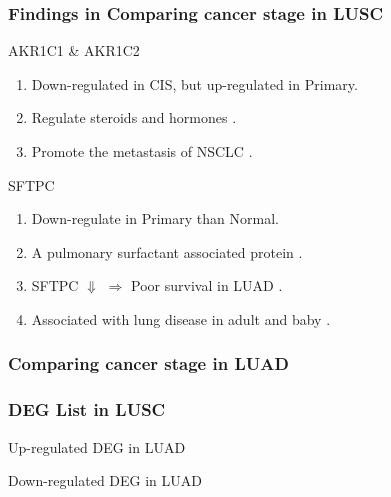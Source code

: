 \documentclass{beamer}
\begin{document}
    \begin{frame}
        \frametitle{Findings in Comparing cancer stage in LUSC}

        \begin{block}{AKR1C1 \& AKR1C2}
            \begin{enumerate}
                \item Down-regulated in CIS, but up-regulated in Primary.
                \item Regulate steroids \cite{AKR1C1-1} and hormones \cite{AKR1C1-2} .
                \item Promote the metastasis of NSCLC \cite{AKR1C1-3}.
            \end{enumerate}
        \end{block}

        \begin{block}{SFTPC}
            \begin{enumerate}
                \item Down-regulate in Primary than Normal.
                \item A pulmonary surfactant associated protein \cite{SFTPC4}.
                \item SFTPC $\Downarrow$ $\Rightarrow$ Poor survival in LUAD \cite{SFTPC1}.
                \item Associated with lung disease in adult \cite{SFTPC2} and baby \cite{SFTPC3}.
            \end{enumerate}
        \end{block}
    \end{frame}

    \subsubsection{Comparing cancer stage in LUAD}
    \begin{frame}
        \frametitle{DEG List in LUSC}

        \begin{table}
            \caption{Up-regulated DEG in LUAD}
            
        \end{table}

        \begin{table}
            \caption{Down-regulated DEG in LUAD}
            
        \end{table}
    \end{frame}
\end{document}
